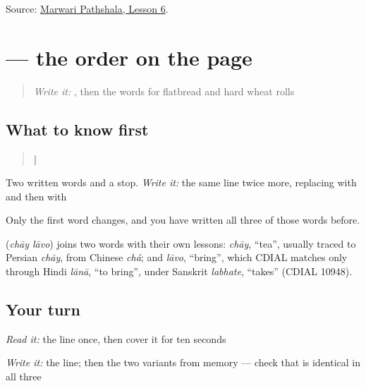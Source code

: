 \begin{tcolorbox}[breakable,colback=teal!4,colframe=teal!35!black,title={Before you move on}]
Source: \href{https://www.marwaripathshala.com/marwari-lesson-6-english}{Marwari Pathshala, Lesson 6}.
\end{tcolorbox}
\section[\texorpdfstring{\mw{चाय} \mw{लावो।} (chāy lāvo.)}{चाय लावो। (chāy lāvo.)}]{  — the order on the page}

\label{lesson:MW-C25-bring-request}



\begin{quote}
\emph{Write it:} \textbf{}, then the words for flatbread and hard wheat rolls
\end{quote}

\subsection*{What to know first}
\begin{quote}
\textbf{ | }
\end{quote}

Two written words and a stop. \emph{Write it:} the same line twice more, replacing \textbf{} with \textbf{} and then with \textbf{}

Only the first word changes, and you have written all three of those words before.

\begin{cousinweb}
\textbf{ } (\emph{chāy lāvo}) joins two words with their own lessons: \emph{chāy}, \textquotedblleft{}tea\textquotedblright{}, usually traced to Persian \emph{chāy}, from Chinese \emph{chá}; and \emph{lāvo}, \textquotedblleft{}bring\textquotedblright{}, which CDIAL matches only through Hindi \emph{lānā}, \textquotedblleft{}to bring\textquotedblright{}, under Sanskrit \emph{labhate}, \textquotedblleft{}takes\textquotedblright{} (CDIAL 10948).
\end{cousinweb}

\subsection*{Your turn}
\emph{Read it:} the line once, then cover it for ten seconds

\emph{Write it:} the line; then the two variants from memory — check that \textbf{} is identical in all three

